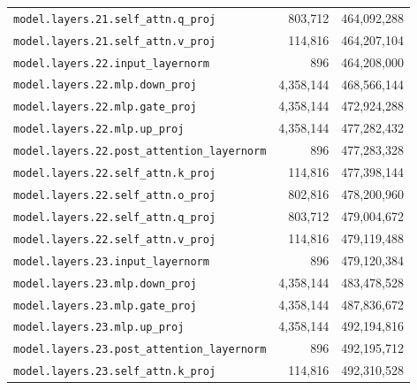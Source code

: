 \documentclass[10pt,a4paper]{article}
\theoremstyle{definition}
\begin{document}
\begin{appendices}
\begin{longtable}{p{9.5cm}rr}
\texttt{model.\allowbreak{}layers.\allowbreak{}21.\allowbreak{}self\_attn.\allowbreak{}q\_proj} & 803,712 & 464,092,288 \\
\texttt{model.\allowbreak{}layers.\allowbreak{}21.\allowbreak{}self\_attn.\allowbreak{}v\_proj} & 114,816 & 464,207,104 \\
\texttt{model.\allowbreak{}layers.\allowbreak{}22.\allowbreak{}input\_layernorm} & 896 & 464,208,000 \\
\texttt{model.\allowbreak{}layers.\allowbreak{}22.\allowbreak{}mlp.\allowbreak{}down\_proj} & 4,358,144 & 468,566,144 \\
\texttt{model.\allowbreak{}layers.\allowbreak{}22.\allowbreak{}mlp.\allowbreak{}gate\_proj} & 4,358,144 & 472,924,288 \\
\texttt{model.\allowbreak{}layers.\allowbreak{}22.\allowbreak{}mlp.\allowbreak{}up\_proj} & 4,358,144 & 477,282,432 \\
\texttt{model.\allowbreak{}layers.\allowbreak{}22.\allowbreak{}post\_attention\_layernorm} & 896 & 477,283,328 \\
\texttt{model.\allowbreak{}layers.\allowbreak{}22.\allowbreak{}self\_attn.\allowbreak{}k\_proj} & 114,816 & 477,398,144 \\
\texttt{model.\allowbreak{}layers.\allowbreak{}22.\allowbreak{}self\_attn.\allowbreak{}o\_proj} & 802,816 & 478,200,960 \\
\texttt{model.\allowbreak{}layers.\allowbreak{}22.\allowbreak{}self\_attn.\allowbreak{}q\_proj} & 803,712 & 479,004,672 \\
\texttt{model.\allowbreak{}layers.\allowbreak{}22.\allowbreak{}self\_attn.\allowbreak{}v\_proj} & 114,816 & 479,119,488 \\
\texttt{model.\allowbreak{}layers.\allowbreak{}23.\allowbreak{}input\_layernorm} & 896 & 479,120,384 \\
\texttt{model.\allowbreak{}layers.\allowbreak{}23.\allowbreak{}mlp.\allowbreak{}down\_proj} & 4,358,144 & 483,478,528 \\
\texttt{model.\allowbreak{}layers.\allowbreak{}23.\allowbreak{}mlp.\allowbreak{}gate\_proj} & 4,358,144 & 487,836,672 \\
\texttt{model.\allowbreak{}layers.\allowbreak{}23.\allowbreak{}mlp.\allowbreak{}up\_proj} & 4,358,144 & 492,194,816 \\
\texttt{model.\allowbreak{}layers.\allowbreak{}23.\allowbreak{}post\_attention\_layernorm} & 896 & 492,195,712 \\
\texttt{model.\allowbreak{}layers.\allowbreak{}23.\allowbreak{}self\_attn.\allowbreak{}k\_proj} & 114,816 & 492,310,528 \\

\end{longtable}
\end{appendices}
\end{document}

